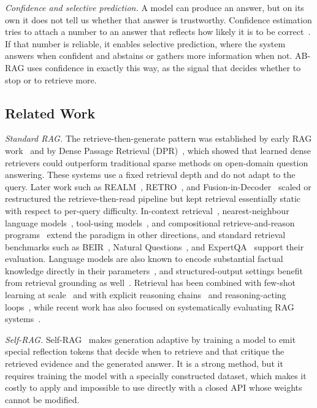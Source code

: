 \documentclass[conference,a4paper,10pt]{IEEEtran}
\begin{document}
\textit{Confidence and selective prediction.}
A model can produce an answer, but on its own it does not tell us whether that answer is
trustworthy. Confidence estimation tries to attach a number to an answer that reflects
how likely it is to be correct~\cite{guo2017calibration, kadavath2022know}. If that
number is reliable, it enables selective prediction, where the system answers when
confident and abstains or gathers more information when not. AB-RAG uses confidence in
exactly this way, as the signal that decides whether to stop or to retrieve more.

\subsection{Related Work}
\textit{Standard RAG.}
The retrieve-then-generate pattern was established by early RAG work~\cite{lewis2020rag}
and by Dense Passage Retrieval (DPR)~\cite{karpukhin2020dpr}, which showed that learned
dense retrievers could outperform traditional sparse methods on open-domain question
answering. These systems use a fixed retrieval depth and do not adapt to the query.
Later work such as REALM~\cite{guu2020realm}, RETRO~\cite{borgeaud2022retro}, and
Fusion-in-Decoder~\cite{izacard2021fid} scaled or restructured the retrieve-then-read
pipeline but kept retrieval essentially static with respect to per-query difficulty.
In-context retrieval~\cite{ram2023incontext}, nearest-neighbour language
models~\cite{he2021efficient}, tool-using models~\cite{schick2023toolformer,
nakano2021webgpt}, and compositional retrieve-and-reason
programs~\cite{khattab2022demonstrate, press2023measuring} extend the paradigm in other
directions, and standard retrieval benchmarks such as BEIR~\cite{thakur2021beir}, Natural
Questions~\cite{kwiatkowski2019natural}, and ExpertQA~\cite{malaviya2023expertqa} support
their evaluation. Language models are also known to encode substantial factual knowledge
directly in their parameters~\cite{petroni2019lama}, and structured-output settings
benefit from retrieval grounding as well~\cite{bechard2024reducing}. Retrieval has been
combined with few-shot learning at scale~\cite{izacard2022atlas} and with explicit
reasoning chains~\cite{wei2022chain} and reasoning-acting loops~\cite{yao2023react}, while
recent work has also focused on systematically evaluating RAG
systems~\cite{es2024ragas, chen2024benchmarking}.

\textit{Self-RAG.}
Self-RAG~\cite{asai2024selfrag} makes generation adaptive by training a model to emit
special reflection tokens that decide when to retrieve and that critique the retrieved
evidence and the generated answer. It is a strong method, but it requires training the
model with a specially constructed dataset, which makes it costly to apply and impossible
to use directly with a closed API whose weights cannot be modified.
\end{document}
